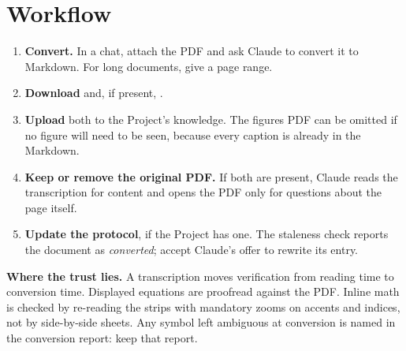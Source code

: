 \documentclass[11pt,a4paper]{article}
\newcommand\step[1]{\textsf{\textbf{#1}}}
\begin{document}
\section{Workflow}
\begin{enumerate}
\item \step{Convert.} In a chat, attach the PDF and ask Claude to convert it to Markdown.
  For long documents, give a page range.
\item \step{Download}  and, if present, .
\item \step{Upload} both to the Project's knowledge. The figures PDF can be omitted if no
  figure will need to be seen, because every caption is already in the Markdown.
\item \step{Keep or remove the original PDF.} If both are present, Claude reads the
  transcription for content and opens the PDF only for questions about the page itself.
\item \step{Update the protocol}, if the Project has one. The staleness check reports the
  document as \emph{converted}; accept Claude's offer to rewrite its entry.
\end{enumerate}

\begin{note}
\textbf{Where the trust lies.} A transcription moves verification from reading time to
conversion time. Displayed equations are proofread against the PDF. Inline math is checked by
re-reading the strips with mandatory zooms on accents and indices, not by side-by-side sheets.
Any symbol left ambiguous at conversion is named in the conversion report: keep that report.
\end{note}
\end{document}
